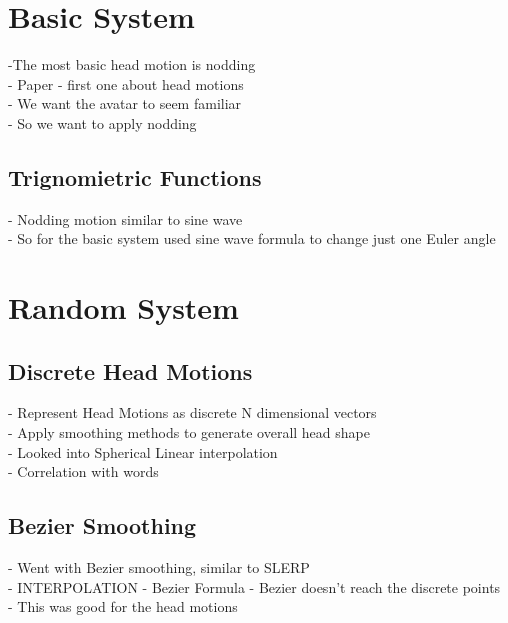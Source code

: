 \documentclass[bsc,frontabs,twoside,singlespacing,parskip]{infthesis}
\begin{document}
\section{Basic System}
-The most basic head motion is nodding \\
- Paper - first one about head motions \\
- We want the avatar to seem familiar \\
- So we want to apply nodding \\

\subsection{Trignomietric Functions}
- Nodding motion similar to sine wave \\
- So for the basic system used sine wave formula to change just one Euler angle \\

\section{Random System}

\subsection{Discrete Head Motions}
- Represent Head Motions as discrete N dimensional vectors \\
- Apply smoothing methods to generate overall head shape \\
- Looked into Spherical Linear interpolation \\
\cite{rigid_head_motion}
- Correlation with words


\subsection{Bezier Smoothing}

- Went with Bezier smoothing, similar to SLERP\\
- INTERPOLATION
- Bezier Formula
- Bezier doesn't reach the discrete points\\
- This was good for the head motions \\
\end{document}
